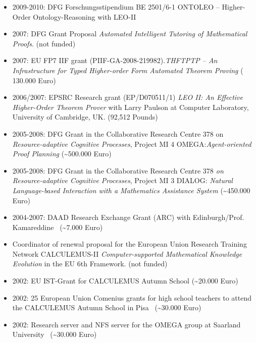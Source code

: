 \documentclass{letter}
\newcommand{\tmem}[1]{{\em #1\/}}
\newcommand{\tmtextit}[1]{{\itshape{#1}}}
\begin{document}
\begin{itemize}
  \item 2009-2010: DFG Forschungsstipendium BE 2501/6-1 ONTOLEO --
  Higher-Order Ontology-Reasoning with LEO-II
  
  \item 2007: DFG Grant Proposal {\tmem{Automated Intelligent Tutoring of
  Mathematical Proofs}}. (not funded)
  
  \item 2007: EU FP7 IIF grant (PIIF-GA-2008-219982).{\tmem{THFTPTP -- An
  Infrastructure for Typed Higher-order Form Automated Theorem Proving}} (\~{
  }130.000 Euro)
  
  \item 2006/2007: EPSRC Research grant (EP/D070511/1) {\tmem{LEO II: An
  Effective Higher-Order Theorem Prover}} with Larry Paulson at Computer
  Laboratory, University of Cambridge, UK. (92,512 Pounds)
  
  \item {\small 2005-2008: DFG Grant in the Collaborative Research Centre 378
  on \tmtextit{Resource-adaptive Cognitive Processes}, Project MI 4
  OMEGA:}\tmtextit{{\small  Agent-oriented Proof Planning}} (\~{ }500.000
  Euro)
  
  \item {\small 2005-2008: DFG Grant in the Collaborative Research Centre
  378\tmtextit{ on Resource-adaptive Cognitive Processes}, Project MI 3
  DIALOG: \tmtextit{Natural Language-based Interaction with a Mathematics
  Assistance System}} (\~{ }450.000 Euro)
  
  \item 2004-2007: DAAD Research Exchange Grant (ARC) with Edinburgh/Prof.
  Kamareddine \ (\~{ }7.000 Euro)
  
  \item Coordinator of renewal proposal for the European Union Research
  Training Network CALCULEMUS-II \tmtextit{Computer-supported Mathematical
  Knowledge Evolution} in the EU 6th Framework. (not funded)
  
  \item {\small 2002: EU IST-Grant for CALCULEMUS Autumn School} (\~{ }20.000
  Euro)
  
  \item {\small 2002: 25 European Union Comenius grants for high school
  teachers to attend the CALCULEMUS Autumn School in Pisa} \ (\~{ }30.000
  Euro)
  
  \item {\small 2002: Research server and NFS server for the OMEGA group at
  Saarland University} \ (\~{ }30.000 Euro)
  

\end{itemize}
\end{document}
